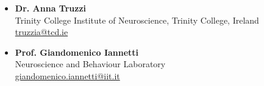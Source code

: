 \documentclass[10pt,a4paper]{altacv}
\begin{document}
\begin{fullwidth}
\begin{itemize}
			\item \textbf{Dr. Anna Truzzi}\\
			Trinity College Institute of Neuroscience, Trinity College, Ireland\\
			\href{mailto:truzzia@tcd.ie}{truzzia@tcd.ie}
			
			\item \textbf{Prof. Giandomenico Iannetti}\\
			Neuroscience and Behaviour Laboratory\\
			\href{mailto:giandomenico.iannetti@iit.it}{giandomenico.iannetti@iit.it}

		\end{itemize}
		
	\end{fullwidth}
	
\end{document}

